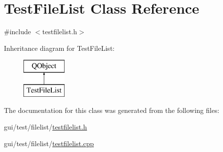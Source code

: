 \hypertarget{class_test_file_list}{\section{Test\-File\-List Class Reference}
\label{class_test_file_list}
}


{\ttfamily \#include $<$testfilelist.\-h$>$}

Inheritance diagram for Test\-File\-List\-:\begin{figure}[H]
\begin{center}
\leavevmode
\includegraphics[height=2.000000cm]{class_test_file_list}
\end{center}
\end{figure}


The documentation for this class was generated from the following files\-:\begin{DoxyCompactItemize}
\item 
gui/test/filelist/\hyperlink{testfilelist_8h}{testfilelist.\-h}\item 
gui/test/filelist/\hyperlink{testfilelist_8cpp}{testfilelist.\-cpp}\end{DoxyCompactItemize}
